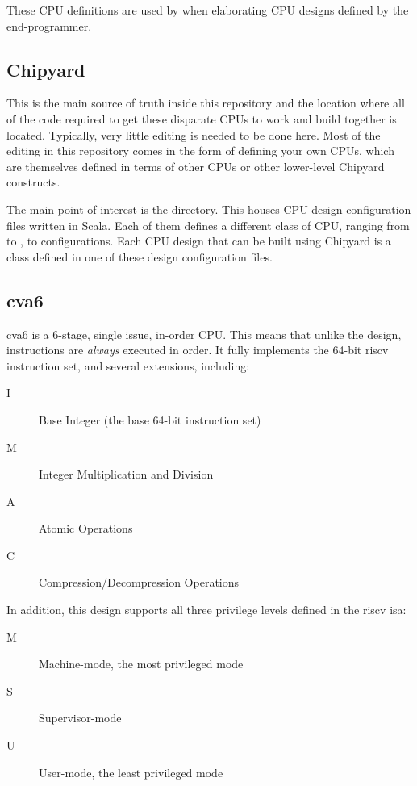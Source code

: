These CPU definitions are used by  when elaborating CPU designs defined by the end-programmer.

\subsection{Chipyard}\label{sec:Chipyard_Generator}
This is the main source of truth inside this repository and the location where all of the code required to get these disparate CPUs to work and build together is located.
Typically, very little editing is needed to be done here.
Most of the editing in this repository comes in the form of defining your own CPUs, which are themselves defined in terms of other CPUs or other lower-level Chipyard constructs.

The main point of interest is the  directory.
This houses CPU design configuration files written in Scala.
Each of them defines a different class of CPU, ranging from  to , to  configurations.
Each CPU design that can be built using Chipyard is a class defined in one of these design configuration files.

\subsection{cva6}\label{sec:cva6_Generator}
\nocite{cva6Github}
\nocite{zaruba2019cost}
cva6 is a 6-stage, single issue, in-order CPU.\@
This means that unlike the  design, instructions are \emph{always} executed in order.
It fully implements the 64-bit \Gls{riscv} instruction set, and several extensions, including:
\begin{description}
\item[I] Base Integer (the base 64-bit instruction set)
\item[M] Integer Multiplication and Division
\item[A] Atomic Operations
\item[C] Compression/Decompression Operations
\end{description}

In addition, this design supports all three privilege levels defined in the \Gls{riscv} \Gls{isa}:
\begin{description}
\item[M] Machine-mode, the most privileged mode
\item[S] Supervisor-mode
\item[U] User-mode, the least privileged mode
\end{description}

